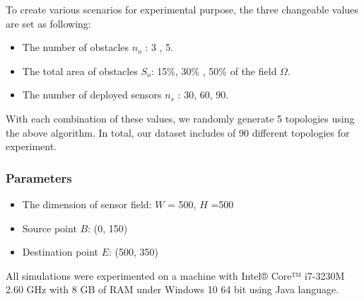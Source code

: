 \documentclass[final]{elsarticle}
\begin{document}
%
%

To create various scenarios for experimental purpose, the three changeable values are set as following:
\begin{itemize}
	\item The number of obstacles $n_o$ : 3 , 5.
	\item The total area of obstacles $S_o$: 15\%, 30\% , 50\% of the field $\Omega$.
	\item The number of deployed sensors $n_s$ : 30, 60, 90.
\end{itemize}
With each combination of these values, we randomly generate 5 topologies using the above algorithm. In total, our dataset includes of 90 different topologies for experiment.

\subsubsection{Parameters}
\begin{itemize}
	\item The dimension of sensor field: $ W $ = 500, $ H $ =500
	\item Source point $ B $: (0, 150) 
	\item Destination point $ E $: (500, 350)	
\end{itemize}
All simulations were experimented on a machine with Intel® Core™ i7-3230M 2.60 GHz with 8 GB of RAM under Windows 10 64 bit using Java language.
\end{document}
